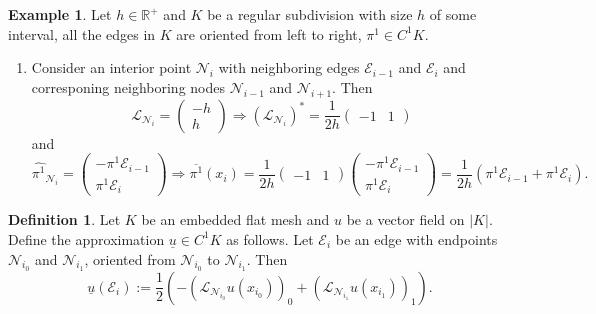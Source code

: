 \documentclass[fleqn]{article}
\theoremstyle{definition}
\newtheorem{definition}[theorem]{Definition}
\newtheorem{example}[theorem]{Example}
\begin{document}
\begin{example}
  Let $h \in \mathbb{R}^+$ and $K$ be a regular subdivision with size $h$
  of some interval,
  all the edges in $K$ are oriented from left to right,
  $\pi^1 \in C^1 K$.
  \begin{enumerate}
    \item
      Consider an interior point $\mathcal{N}_i$ with neighboring edges
      $\mathcal{E}_{i - 1}$ and $\mathcal{E}_i$ and corresponing neighboring
      nodes $\mathcal{N}_{i - 1}$ and $\mathcal{N}_{i + 1}$.
      Then
      \begin{equation}
        \mathcal{L}_{\mathcal{N}_i} =
        \begin{pmatrix}
          -h \\
          h
        \end{pmatrix}
        \Rightarrow
        (\mathcal{L}_{\mathcal{N}_i})^* =
          \frac{1}{2 h}
          \begin{pmatrix}
            -1 & 1
          \end{pmatrix}
      \end{equation}
      and
      \begin{equation}
        \widehat{\pi^1}_{\mathcal{N}_i} =
        \begin{pmatrix}
          - \pi^1 \mathcal{E}_{i - 1} \\
          \pi^1 \mathcal{E}_i
        \end{pmatrix}
        \Rightarrow
        \overline{\pi^1}(x_i) =
          \frac{1}{2 h}
          \begin{pmatrix}
            -1 & 1
          \end{pmatrix}
          \begin{pmatrix}
            - \pi^1 \mathcal{E}_{i - 1} \\
            \pi^1 \mathcal{E}_i
          \end{pmatrix}
        = \frac{1}{2 h}
          \left(\pi^1 \mathcal{E}_{i - 1} + \pi^1 \mathcal{E}_i\right).
      \end{equation}
  \end{enumerate}
\end{example}

\begin{definition}
  Let $K$ be an embedded flat mesh and $u$ be a vector field on $|K|$.
  Define the approximation $\underline{u} \in C^1 K$ as follows.
  Let $\mathcal{E}_i$ be an edge with endpoints $\mathcal{N}_{i_0}$ and
  $\mathcal{N}_{i_1}$, oriented from $\mathcal{N}_{i_0}$ to $\mathcal{N}_{i_1}$.
  Then
  \begin{equation}
    \underline{u}(\mathcal{E}_i) :=
      \frac{1}{2}
      ( - (\mathcal{L}_{\mathcal{N}_{i_0}} u(x_{i_0}))_0
        + (\mathcal{L}_{\mathcal{N}_{i_1}} u(x_{i_1}))_1
      ).
  \end{equation}
\end{definition}
\end{document}
